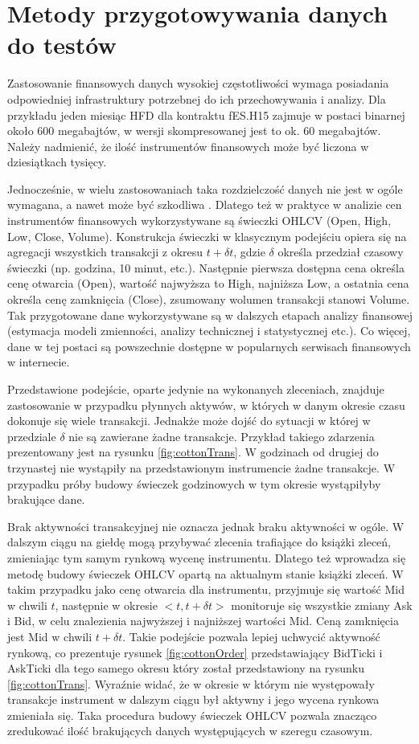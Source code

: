 \documentclass[a4paper,12pt,openany, DIV=calc, headsepline]{scrbook}
\begin{document}
\section{Metody przygotowywania danych do testów}

Zastosowanie finansowych danych wysokiej częstotliwości wymaga posiadania odpowiedniej infrastruktury potrzebnej do ich przechowywania i analizy. Dla przykładu jeden miesiąc HFD dla kontraktu fES.H15 zajmuje w postaci binarnej około 600 megabajtów, w wersji skompresowanej jest to ok. 60 megabajtów. Należy nadmienić, że ilość instrumentów finansowych może być liczona w dziesiątkach tysięcy.

Jednocześnie, w wielu zastosowaniach taka rozdzielczość danych nie jest w ogóle wymagana, a nawet może być szkodliwa \citep{doman2009modelowanie}. Dlatego też w praktyce w analizie cen instrumentów finansowych wykorzystywane są świeczki OHLCV (Open, High, Low, Close, Volume). Konstrukcja świeczki w klasycznym podejściu opiera się na agregacji wszystkich transakcji z okresu $t + \delta t$, gdzie $\delta$ określa przedział czasowy świeczki (np. godzina, 10 minut, etc.). Następnie pierwsza dostępna cena określa cenę otwarcia (Open), wartość najwyższa to High, najniższa Low, a ostatnia cena określa cenę zamknięcia (Close), zsumowany wolumen transakcji stanowi Volume. Tak przygotowane dane wykorzystywane są w dalszych etapach analizy finansowej (estymacja modeli zmienności, analizy technicznej i statystycznej etc.). Co więcej, dane w tej postaci są powszechnie dostępne w popularnych serwisach finansowych w internecie.

Przedstawione podejście, oparte jedynie na wykonanych zleceniach, znajduje zastosowanie w przypadku płynnych aktywów, w których w danym okresie czasu dokonuje się wiele transakcji. Jednakże może dojść do sytuacji w której w przedziale $\delta$ nie są zawierane żadne transakcje. Przykład takiego zdarzenia prezentowany jest na rysunku \ref{fig:cottonTrans}. W godzinach od drugiej do trzynastej nie wystąpiły na przedstawionym instrumencie żadne transakcje. W przypadku próby budowy świeczek godzinowych w tym okresie wystąpiłyby brakujące dane.

Brak aktywności transakcyjnej nie oznacza jednak braku aktywności w ogóle. W dalszym ciągu na giełdę mogą przybywać zlecenia trafiające do książki zleceń, zmieniając tym samym rynkową wycenę instrumentu. Dlatego też wprowadza się metodę budowy świeczek OHLCV opartą na aktualnym stanie książki zleceń. W takim przypadku jako cenę otwarcia dla instrumentu, przyjmuje się wartość Mid w chwili $t$, następnie w okresie $<t,t + \delta t>$ monitoruje się wszystkie zmiany Ask i Bid, w celu znalezienia najwyższej i najniższej wartości Mid. Ceną zamknięcia jest Mid w chwili $t + \delta t$. Takie podejście pozwala lepiej uchwycić aktywność rynkową, co prezentuje rysunek \ref{fig:cottonOrder} przedstawiający BidTicki i AskTicki dla tego samego okresu który został przedstawiony na rysunku \ref{fig:cottonTrans}. Wyraźnie widać, że w okresie w którym nie występowały transakcje instrument w dalszym ciągu był aktywny i jego wycena rynkowa zmieniała się. Taka procedura budowy świeczek OHLCV pozwala znacząco zredukować ilość brakujących danych występujących w szeregu czasowym. 
\end{document}
